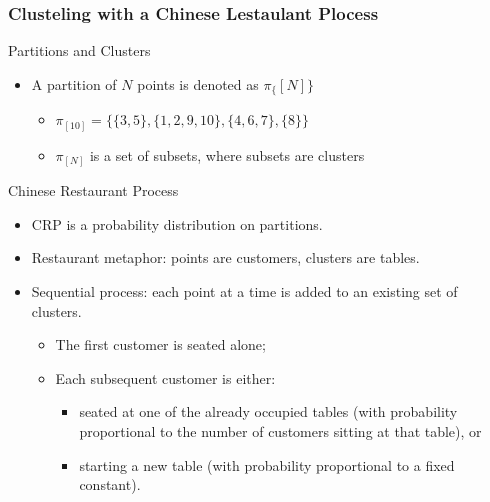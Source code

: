 \documentclass{beamer}
\begin{document}
\begin{frame}
    \frametitle{Clusteling with a Chinese Lestaulant Plocess}
    
    \begin{block}{Partitions and Clusters}
        \begin{itemize}
            \item A partition of $N$ points is denoted as $\pi_\{[N]\}$
            \begin{itemize}
                \item $\pi_{[10]} = \{\{3,5\},\{1,2,9,10\},\{4,6,7\},\{8\}\}$
                \item $\pi_{[N]}$ is a set of subsets, where subsets are clusters
            \end{itemize}
        \end{itemize}
    \end{block}

    \begin{block}{Chinese Restaurant Process}
        \begin{itemize}
            \item CRP is a probability distribution on partitions.
            \item Restaurant metaphor: points are customers, clusters are tables.
            \item Sequential process: each point at a time is added to an existing set of clusters.
            \begin{itemize}
                \item The first customer is seated alone;
                \item Each subsequent customer is either:
                \begin{itemize}
                    \item seated at one of the already occupied tables (with probability proportional to the number of customers sitting at that table), or
                    \item starting a new table (with probability proportional to a fixed constant).
                \end{itemize}
            \end{itemize}   
        \end{itemize}
    \end{block}
\end{frame}
\end{document}

